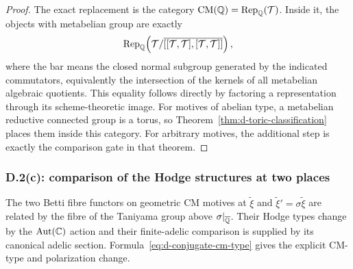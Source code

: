 \begin{proof}
The exact replacement is the category $\operatorname{CM}(\mathbb Q)=\operatorname{Rep}_\mathbb Q(\mathcal T)$.
Inside it, the objects with metabelian group are exactly
\[
 \operatorname{Rep}_\mathbb Q\!\left(\mathcal T/
       \overline{[[\mathcal T,\mathcal T],[\mathcal T,\mathcal T]]}\right),
\]
where the bar means the closed normal subgroup generated by the
indicated commutators, equivalently the intersection of the kernels
of all metabelian algebraic quotients.  This equality follows directly
by factoring a representation through its scheme-theoretic image.
For motives of abelian type, a metabelian reductive connected group
is a torus, so Theorem~\ref{thm:d-toric-classification} places them
inside this category.  For arbitrary motives, the additional step is
exactly the comparison gate in that theorem.
\end{proof}

\subsubsection{D.2(c): comparison of the Hodge structures at two places}

\begin{proposition}
\label{prop:d-hodge-comparison}
The two Betti fibre functors on geometric CM motives at
$\widetilde\xi$ and $\widetilde\xi'=\sigma\widetilde\xi$
are related by the fibre of the Taniyama group above
$\sigma|_{\overline{\mathbb Q}}$.  Their Hodge types change by the
$\operatorname{Aut}(\mathbb C)$ action and their finite-adelic comparison is supplied
by its canonical adelic section.  Formula~\eqref{eq:d-conjugate-cm-type}
gives the explicit CM-type and polarization change.
\end{proposition}

